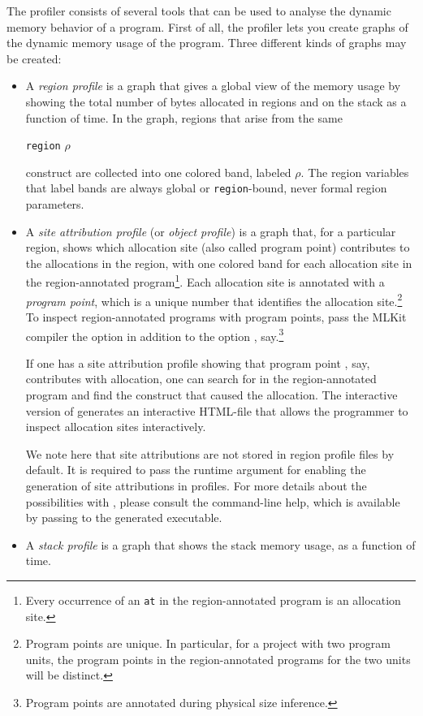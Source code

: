 \documentclass[12pt]{book}
\begin{document}
The profiler consists of several tools that can be used to analyse the dynamic
memory behavior of a program. First of all, the profiler lets you create graphs
of the dynamic memory usage of the program. Three different kinds of graphs may
be created:
\begin{itemize}
\item A
  \emph{region profile} is a graph that gives a global view of the memory usage
  by showing the total number of bytes allocated in regions and on the stack as
  a function of time. In the graph, regions that arise from the same
  \begin{center}
    \lstinline{region} $\rho$
  \end{center}
  construct are collected into one colored band, labeled $\rho$. The region
  variables that label bands are always global or \lstinline{region}-bound, never
  formal region parameters.
\item A
  \emph{site attribution profile} (or \emph{object profile}) is a graph that,
  for a particular region, shows which allocation site (also called program
  point) contributes to the allocations in the region, with one colored band for
  each allocation site in the region-annotated program\footnote{Every occurrence
  of an \lstinline{at} in the region-annotated program is an allocation
  site.}. Each allocation site is annotated with a
  \emph{program point}, which is a unique number that identifies the
  allocation site.\footnote{Program points are unique. In particular, for a project
  with two program units, the program points in the region-annotated programs
  for the two units will be distinct.}  To inspect region-annotated programs
  with program points, pass the MLKit compiler the option
   in addition to the option
  , say.\footnote{Program points are
  annotated during physical size inference.}

  If one has a site attribution profile showing that program point , say,
  contributes with allocation, one can search for  in the
  region-annotated program and find the construct that caused the
  allocation. The interactive version of  generates an
  interactive HTML-file that allows the programmer to inspect allocation sites
  interactively.

  We note here that site attributions are not stored in region profile files by
  default. It is required to pass the runtime argument
  for enabling the generation of site attributions in profiles. For more details
  about the possibilities with , please consult the
  command-line help, which is available by passing  to
  the generated executable.
\item A
  \emph{stack profile} is a graph that shows the stack memory usage, as a
  function of time.
\end{itemize}
\end{document}
